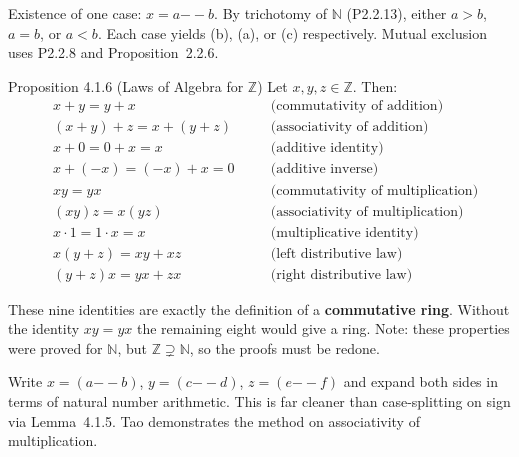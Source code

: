 \begin{remark*}
Existence of one case: $x = a {-\!\!-} b$.
By trichotomy of $\mathbb{N}$ (P2.2.13), either $a > b$, $a = b$,
or $a < b$.
Each case yields (b), (a), or (c) respectively.
Mutual exclusion uses P2.2.8 and Proposition~2.2.6.
\end{remark*}

\begin{propositionbox}{Proposition 4.1.6 (Laws of Algebra for $\mathbb{Z}$)}
Let $x, y, z \in \mathbb{Z}$. Then:
\begin{align*}
&x + y = y + x &\quad& \text{(commutativity of addition)}\\
&(x+y)+z = x+(y+z) &\quad& \text{(associativity of addition)}\\
&x + 0 = 0 + x = x &\quad& \text{(additive identity)}\\
&x + (-x) = (-x) + x = 0 &\quad& \text{(additive inverse)}\\
&xy = yx &\quad& \text{(commutativity of multiplication)}\\
&(xy)z = x(yz) &\quad& \text{(associativity of multiplication)}\\
&x \cdot 1 = 1 \cdot x = x &\quad& \text{(multiplicative identity)}\\
&x(y+z) = xy + xz &\quad& \text{(left distributive law)}\\
&(y+z)x = yx + zx &\quad& \text{(right distributive law)}
\end{align*}
\end{propositionbox}

\begin{remark*}
These nine identities are exactly the definition of a
\textbf{commutative ring}.
Without the identity $xy = yx$ the remaining eight would give a ring.
Note: these properties were proved for $\mathbb{N}$, but
$\mathbb{Z} \supsetneq \mathbb{N}$, so the proofs must be redone.
\end{remark*}

\begin{remark*}
Write $x = (a {-\!\!-} b)$, $y = (c {-\!\!-} d)$, $z = (e {-\!\!-} f)$
and expand both sides in terms of natural number arithmetic.
This is far cleaner than case-splitting on sign via Lemma~4.1.5.
Tao demonstrates the method on associativity of multiplication.
\end{remark*}

